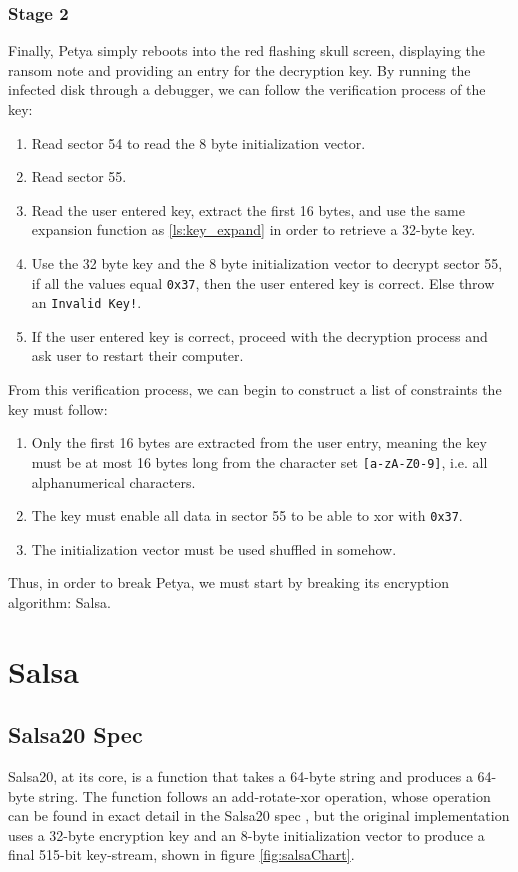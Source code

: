 \documentclass[twocolumn]{article}
\newcommand{\code}[1]{\texttt{#1}}
\begin{document}
\subsubsection{Stage 2}
\label{sec:stage2}
Finally, Petya simply reboots into the red flashing skull screen, displaying the ransom note and providing an entry for the decryption key. By running the infected disk through a debugger, we can follow the verification process of the key:

\begin{enumerate}
	\item Read sector 54 to read the 8 byte initialization vector.
	\item Read sector 55.
	\item Read the user entered key, extract the first 16 bytes, and use the same expansion function as \ref{ls:key_expand} in order to retrieve a 32-byte key.
	\item Use the 32 byte key and the 8 byte initialization vector to decrypt sector 55, if all the values equal \code{0x37}, then the user entered key is correct. Else throw an \code{Invalid Key!}.
	\item If the user entered key is correct, proceed with the decryption process and ask user to restart their computer. 
\end{enumerate}

From this verification process, we can begin to construct a list of constraints the key must follow:

\begin{enumerate}
	\item Only the first 16 bytes are extracted from the user entry, meaning the key must be at most 16 bytes long from the character set \verb|[a-zA-Z0-9]|, i.e. all alphanumerical characters.
	\item The key must enable all data in sector 55 to be able to xor with \code{0x37}.
	\item The initialization vector must be used shuffled in somehow.  
\end{enumerate}

Thus, in order to break Petya, we must start by breaking its encryption algorithm: Salsa.

\section{Salsa}
\label{sec:salsa}
\subsection{Salsa20 Spec}
Salsa20, at its core, is a function that takes a 64-byte string and produces a 64-byte string. The function follows an add-rotate-xor operation, whose operation can be found in exact detail in the Salsa20 spec \cite{salsa20Spec}, but the original implementation uses a 32-byte encryption key and an 8-byte initialization vector to produce a final 515-bit key-stream, shown in figure \ref{fig:salsaChart}. 
\end{document}

